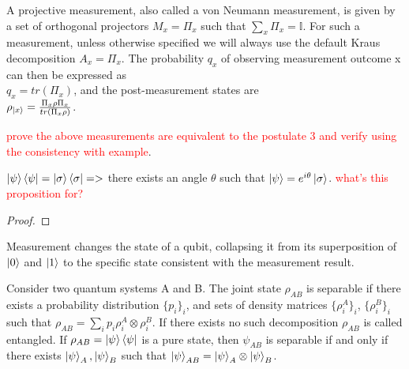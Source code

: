 \begin{definition} \label{projective measurement}
A projective measurement, also called a von Neumann measurement, is given by a set of orthogonal projectors $M_x=\Pi_x$ such that $\sum_x \Pi_x=\mathbb{I}$. For such a measurement, unless otherwise specified we will always use the default Kraus decomposition $A_x=\Pi_x$. The probability $q_x$ of observing measurement outcome x can then be expressed as\\
$q_x=tr(\Pi_x)$,
and the post-measurement states are \\
$\rho_{\ket{x}}=\frac{\Pi_x \rho \Pi_x}{tr(\Pi_x \rho)}$.
\end{definition}

\textcolor{red}{prove the above measurements are equivalent to the postulate 3 and verify using the consistency with example}.


\begin{prop}
$\ket{\psi}\bra{\psi}=\ket{\sigma}\bra{\sigma} =>$ there exists an angle $\theta$ such that $\ket{\psi}=e^{i\theta}\ket{\sigma}$.
\textcolor{red}{what's this proposition for?}
\end{prop}

\begin{proof}

\end{proof}

Measurement changes the state of a qubit, collapsing it from its superposition of $\ket{0}$ and $\ket{1}$ to the specific state consistent with the measurement result.  



\begin{definition}[Entanglement]
 Consider two quantum systems A and B. The joint state $\rho_{AB}$ is separable if there exists a probability distribution $\{p_i\}_i$, and sets of density matrices $\{\rho_i^A\}_i$, $\{\rho_i^B\}_i$ such that $\rho_{AB}=\sum_i p_i\rho_i^A\otimes\rho_i^B$.
 If there exists no such decomposition $\rho_{AB}$ is called entangled.
 If $\rho_{AB}=\ket{\psi}\bra{\psi}$ is a pure state, then $\psi_{AB}$ is separable if and only if there exists $\ket{\psi}_A, \ket{\psi}_B$ such that $\ket{\psi}_{AB}=\ket{\psi}_A \otimes \ket{\psi}_B$.
\end{definition}

